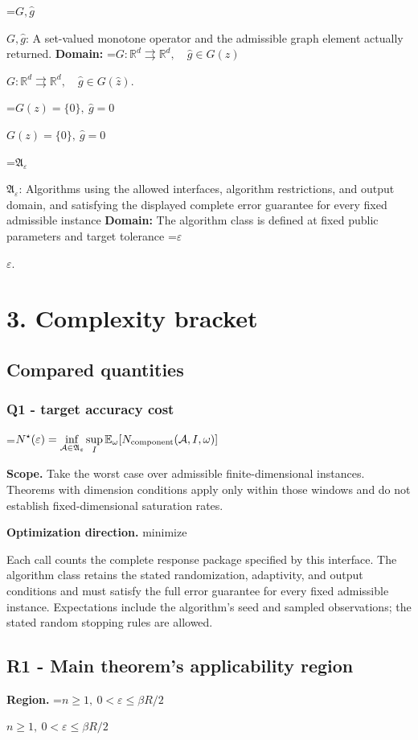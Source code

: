 \documentclass[10pt,a4paper]{article}
\newcommand{\AtlasMath}[1]{\par\begingroup\centering\setbox0=\hbox{$\displaystyle #1$}\ifdim\wd0>1.4\linewidth\typeout{ATLAS WIDE FORMULA: \the\wd0}\fi\ifdim\wd0>\linewidth\resizebox{\linewidth}{!}{\box0}\else\box0\fi\par\endgroup}
\newcommand{\AtlasInlineMath}[1]{\begingroup\setbox0=\hbox{$#1$}\ifdim\wd0>.4\linewidth\endgroup\AtlasMath{#1}\else\endgroup$#1$\fi}
\begin{document}
\AtlasInlineMath{G,\widehat g}: A set-valued monotone operator and the admissible graph element actually returned. \textbf{Domain:} \AtlasInlineMath{G:\mathbb R^d\rightrightarrows\mathbb R^d,\quad\widehat g\in G(\widehat z)}.

\AtlasInlineMath{G(z)=\{0\},\ \widehat g=0}

\AtlasInlineMath{\mathfrak A_\varepsilon}: Algorithms using the allowed interfaces, algorithm restrictions, and output domain, and satisfying the displayed complete error guarantee for every fixed admissible instance \textbf{Domain:} The algorithm class is defined at fixed public parameters and target tolerance \AtlasInlineMath{\varepsilon}.

\section{3. Complexity bracket}
\subsection{Compared quantities}
\subsubsection{Q1 - target accuracy cost}
\AtlasMath{N^\star(\varepsilon)=\inf_{\mathcal A\in\mathfrak A_\varepsilon}\sup_I \mathbb E_\omega[N_{\rm component}(\mathcal A,I,\omega)]}
\textbf{Scope.} Take the worst case over admissible finite-dimensional instances. Theorems with dimension conditions apply only within those windows and do not establish fixed-dimensional saturation rates.

\textbf{Optimization direction.} minimize

Each call counts the complete response package specified by this interface. The algorithm class retains the stated randomization, adaptivity, and output conditions and must satisfy the full error guarantee for every fixed admissible instance. Expectations include the algorithm's seed and sampled observations; the stated random stopping rules are allowed.

\subsection{R1 - Main theorem's applicability region}
\textbf{Region.} \AtlasInlineMath{n\ge1,\ 0<\varepsilon\le\beta R/2}
\end{document}
